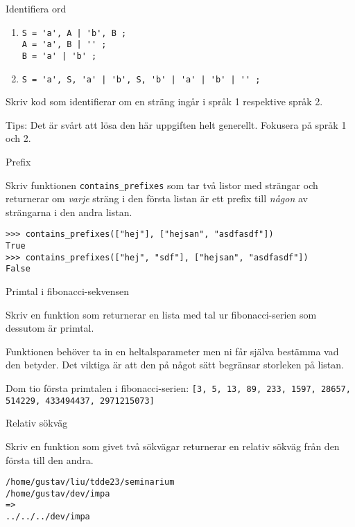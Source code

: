 \documentclass{beamer}
\begin{document}
  \begin{frame}[fragile]{Identifiera ord}

    \begin{enumerate}
      \item \begin{Verbatim}
S = 'a', A | 'b', B ;
A = 'a', B | '' ;
B = 'a' | 'b' ;
      \end{Verbatim}
      \item \begin{Verbatim}
S = 'a', S, 'a' | 'b', S, 'b' | 'a' | 'b' | '' ;
      \end{Verbatim}
    \end{enumerate}

    Skriv kod som identifierar om en sträng ingår i språk 1 respektive språk 2.

    Tips: Det är svårt att lösa den här uppgiften helt generellt. Fokusera på språk 1 och 2.

  \end{frame}

  \begin{frame}[fragile]{Prefix}

    Skriv funktionen \texttt{contains\_prefixes} som tar två listor med strängar
    och returnerar om \emph{varje} sträng i den första listan är ett prefix till
    \emph{någon} av strängarna i den andra listan.

    \begin{lstlisting}
>>> contains_prefixes(["hej"], ["hejsan", "asdfasdf"])
True
>>> contains_prefixes(["hej", "sdf"], ["hejsan", "asdfasdf"])
False
    \end{lstlisting}

  \end{frame}

  \begin{frame}{Primtal i fibonacci-sekvensen}

    Skriv en funktion som returnerar en lista med tal ur fibonacci-serien som
    dessutom är primtal.

    Funktionen behöver ta in en heltalsparameter men ni får själva bestämma vad
    den betyder. Det viktiga är att den på något sätt begränsar storleken på
    listan.

    Dom tio första primtalen i fibonacci-serien:
    \texttt{[3, 5, 13, 89, 233, 1597, 28657, 514229, 433494437, 2971215073]}

  \end{frame}

  \begin{frame}[fragile]{Relativ sökväg}

    Skriv en funktion som givet två sökvägar returnerar en relativ sökväg från
    den första till den andra.

    \begin{lstlisting}
/home/gustav/liu/tdde23/seminarium
/home/gustav/dev/impa
=>
../../../dev/impa
    \end{lstlisting}

  \end{frame}
\end{document}
